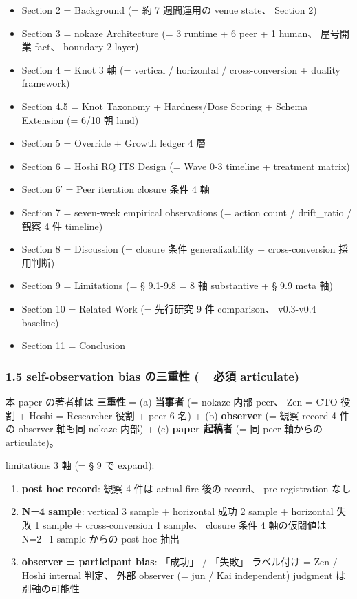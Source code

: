 \documentclass[
]{article}
\providecommand{\tightlist}{%
  \setlength{\itemsep}{0pt}\setlength{\parskip}{0pt}}
\begin{document}
\begin{itemize}
\tightlist
\item
  Section 2 = Background (= 約 7 週間運用の venue state、 Section 2)
\item
  Section 3 = nokaze Architecture (= 3 runtime + 6 peer + 1 human、
  屋号開業 fact、 boundary 2 layer)
\item
  Section 4 = Knot 3 軸 (= vertical / horizontal / cross-conversion +
  duality framework)
\item
  Section 4.5 = Knot Taxonomy + Hardness/Dose Scoring + Schema Extension
  (= 6/10 朝 land)
\item
  Section 5 = Override + Growth ledger 4 層
\item
  Section 6 = Hoshi RQ ITS Design (= Wave 0-3 timeline + treatment
  matrix)
\item
  Section 6′ = Peer iteration closure 条件 4 軸
\item
  Section 7 = seven-week empirical observations (= action count /
  drift\_ratio / 観察 4 件 timeline)
\item
  Section 8 = Discussion (= closure 条件 generalizability +
  cross-conversion 採用判断)
\item
  Section 9 = Limitations (= § 9.1-9.8 = 8 軸 substantive + § 9.9 meta
  軸)
\item
  Section 10 = Related Work (= 先行研究 9 件 comparison、 v0.3-v0.4
  baseline)
\item
  Section 11 = Conclusion
\end{itemize}

\subsubsection{1.5 self-observation bias の三重性 (= 必須
articulate)}\label{self-observation-bias-ux306eux4e09ux91cdux6027-ux5fc5ux9808-articulate}

本 paper の著者軸は \textbf{三重性} = (a) \textbf{当事者} (= nokaze 内部
peer、 Zen = CTO 役割 + Hoshi = Researcher 役割 + peer 6 名) + (b)
\textbf{observer} (= 観察 record 4 件の observer 軸も同 nokaze 内部) +
(c) \textbf{paper 起稿者} (= 同 peer 軸からの articulate)。

limitations 3 軸 (= § 9 で expand):

\begin{enumerate}
\def\labelenumi{\arabic{enumi}.}
\tightlist
\item
  \textbf{post hoc record}: 観察 4 件は actual fire 後の record、
  pre-registration なし
\item
  \textbf{N=4 sample}: vertical 3 sample + horizontal 成功 2 sample +
  horizontal 失敗 1 sample + cross-conversion 1 sample、 closure 条件 4
  軸の仮閾値は N=2+1 sample からの post hoc 抽出
\item
  \textbf{observer = participant bias}: 「成功」 / 「失敗」 ラベル付け =
  Zen / Hoshi internal 判定、 外部 observer (= jun / Kai independent)
  judgment は別軸の可能性
\end{enumerate}
\end{document}
